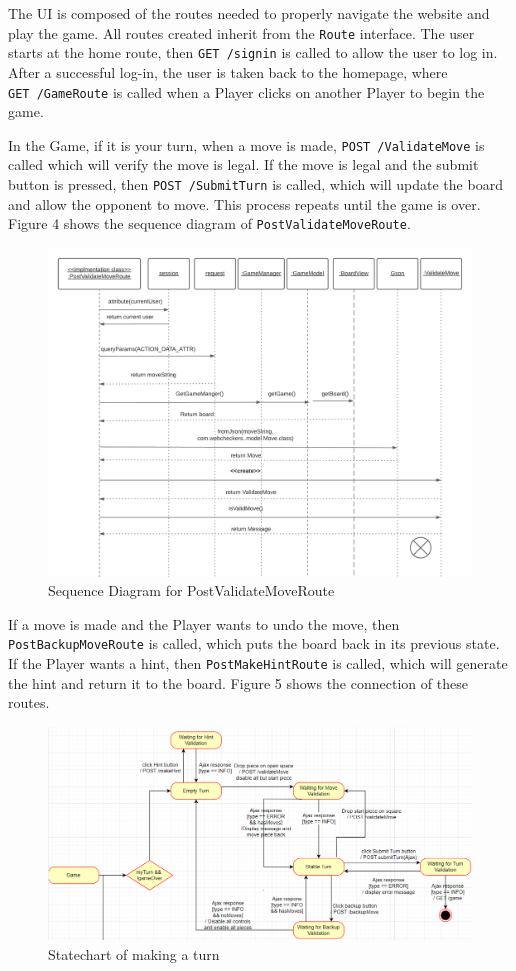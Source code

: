 The UI is composed of the routes needed to properly navigate the website
and play the game. All routes created inherit from the \texttt{Route}
interface. The user starts at the home route, then \texttt{GET\ /signin}
is called to allow the user to log in. After a successful log-in, the
user is taken back to the homepage, where \texttt{GET\ /GameRoute} is
called when a Player clicks on another Player to begin the game.

In the Game, if it is your turn, when a move is made,
\texttt{POST\ /ValidateMove} is called which will verify the move is
legal. If the move is legal and the submit button is pressed, then
\texttt{POST\ /SubmitTurn} is called, which will update the board and
allow the opponent to move. This process repeats until the game is over.
Figure 4 shows the sequence diagram of \texttt{PostValidateMoveRoute}.

\begin{figure}[H]
\centering
\includegraphics{validateMoveSD.png}
\caption{Sequence Diagram for PostValidateMoveRoute}
\end{figure}

If a move is made and the Player wants to undo the move, then
\texttt{PostBackupMoveRoute} is called, which puts the board back in its
previous state. If the Player wants a hint, then
\texttt{PostMakeHintRoute} is called, which will generate the hint and
return it to the board. Figure 5 shows the connection of these routes.

\begin{figure}[H]
\centering
\includegraphics{myTurn-statechart.png}
\caption{Statechart of making a turn}
\end{figure}

